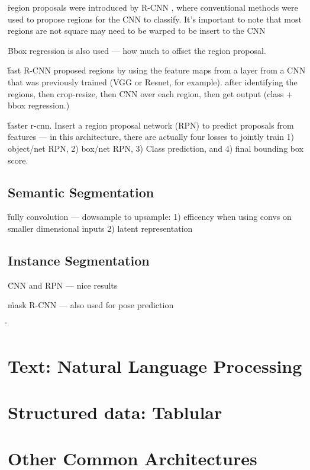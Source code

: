 \r{region proposals were introduced by R-CNN , where conventional methods were used to propose regions for the CNN to classify. It's important to note that most regions are not square may need to be warped to be insert to the CNN}

\r{Bbox regression is also used --- how much to offset the region proposal.}


\r{fast R-CNN proposed regions by using the feature maps from a layer from a CNN that was previously trained (VGG or Resnet, for example). after identifying the regions, then crop-resize, then CNN over each region, then get output (class + bbox regression.)}

\r{faster r-cnn. Insert a region proposal network (RPN) to predict proposals from features --- in this architecture, there are actually four losses to jointly train 1) object/net RPN, 2) box/net RPN, 3) Class prediction, and 4) final bounding box score.}


\subsection{Semantic Segmentation}

\r{fully convolution --- dowsample to upsample: 1) efficency when using convs on smaller dimensional inputs 2) latent representation}

\subsection{Instance Segmentation}

\r{CNN and RPN --- nice results }

\r{mask R-CNN --- also used for pose prediction}

\r{}


\section{Text: Natural Language Processing}


\section{Structured data: Tablular}


\section{Other Common Architectures}

